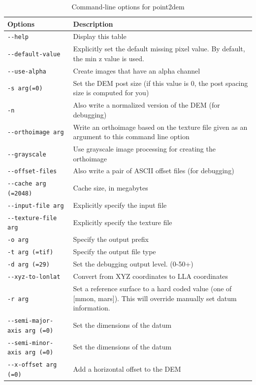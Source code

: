 \begin{longtable}{|l|p{10cm}|}
\caption{Command-line options for point2dem}
\label{tbl:point2dem}
\endfirsthead
\endhead
\endfoot
\endlastfoot
\hline
Options & Description \\ \hline \hline
\verb#--help# & Display this table \\ \hline
\verb#--default-value# & Explicitly set the default missing pixel value. By default, the min z value is used. \\ \hline
\verb#--use-alpha# & Create images that have an alpha channel \\ \hline
\verb#-s arg(=0)# & Set the DEM post size (if this value is 0, the post spacing size is computed for you) \\ \hline
\verb#-n# & Also write a normalized version of the DEM (for debugging) \\ \hline
\verb#--orthoimage arg# & Write an orthoimage based on the texture file given as an argument to this command line option \\ \hline
\verb#--grayscale# & Use grayscale image processing for creating the orthoimage \\ \hline
\verb#--offset-files# & Also write a pair of ASCII offset files (for debugging) \\ \hline
\verb#--cache arg (=2048)# & Cache size, in megabytes \\ \hline
\verb#--input-file arg# & Explicitly specify the input file \\ \hline
\verb#--texture-file arg# & Explicitly specify the texture file \\ \hline
\verb#-o arg# & Specify the output prefix \\ \hline
\verb#-t arg (=tif)# & Specify the output file type \\ \hline
\verb#-d arg (=29)# & Set the debugging output level. (0-50+) \\ \hline
\verb#--xyz-to-lonlat# & Convert from XYZ coordinates to LLA coordinates \\ \hline
\verb#-r arg# & Set a reference surface to a hard coded value (one of [mmon, mars]). This will override manually set datum information. \\ \hline
\verb#--semi-major-axis arg (=0)# & Set the dimensions of the datum \\ \hline
\verb#--semi-minor-axis arg (=0)# & Set the dimensions of the datum \\ \hline
\verb#--x-offset arg (=0)# & Add a horizontal offset to the DEM \\ \hline

\end{longtable}
